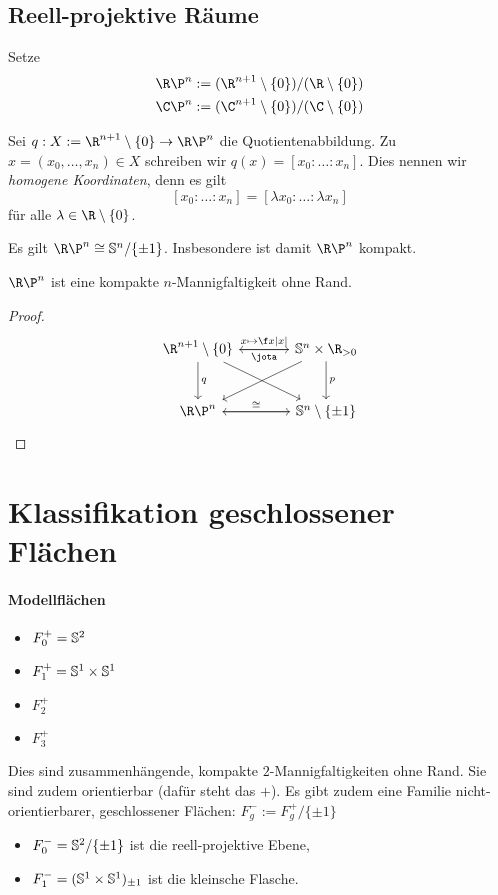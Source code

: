 \subsection{Reell-projektive Räume}

Setze
\begin{align*}
	\R\P^n &:= (\R^{n+1} \setminus \{0\}) / (\R \setminus \{0\}) \\
	\C\P^n &:= (\C^{n+1} \setminus \{0\}) / (\C \setminus \{0\})
\end{align*}

Sei $q: X := \R^{n+1} \setminus \{0\} \to \R\P^n$ die Quotientenabbildung.
Zu $x = (x_0, \dotsc, x_n) \in X$ schreiben wir $q(x) = [x_0 : \dotsc : x_n]$.
Dies nennen wir \emph{homogene Koordinaten}, denn es gilt
\[
	[x_0 : \dotsc : x_n ] = [\lambda x_0 : \dotsc : \lambda x_n]
\]
für alle $\lambda \in \R \setminus \{0\}$.

\begin{nt}
	Es gilt $\R\P^n \homeomorphic \S^n / \{\pm 1\}$.
	Insbesondere ist damit $\R\P^n$ kompakt.

	$\R\P^n$ ist eine kompakte $n$-Mannigfaltigkeit ohne Rand.
	\begin{proof}
		\[
			\begin{tikzcd}[column sep=large,row sep=large]
				\R^{n+1} \setminus \{0\} \arrow{r}{x\mapsto \f x{|x|}} \arrow{d}{q} \arrow{dr}{} &
				\S^n \times \R_{>0} \arrow{l}{\jota} \arrow{dl} \arrow{d}{p} \\
				\R\P^n \arrow{r}{\homeomorphic} &
				\S^n \setminus \{\pm 1\} \arrow{l}
			\end{tikzcd}
		\]
	\end{proof}
\end{nt}


\section{Klassifikation geschlossener Flächen}

\paragraph{Modellflächen}

\begin{ex}
	\begin{itemize}
		\item
			$F_0^+ = \S^2$
		\item
			$F_1^+ = \S^1 \times \S^1$
		\item
			$F_2^+$
		\item
			$F_3^+$
	\end{itemize}
	Dies sind zusammenhängende, kompakte $2$-Mannigfaltigkeiten ohne Rand.
	Sie sind zudem orientierbar (dafür steht das $+$).
	Es gibt zudem eine Familie nicht-orientierbarer, geschlossener Flächen: $F_g^- := F_g^+ / \{\pm 1\}$
	\begin{itemize}
		\item
			$F_0^- = \S^2 / \{\pm 1\}$ ist die reell-projektive Ebene,
		\item
			$F_1^- = (\S^1 \times \S^1)_{\pm 1}$ ist die kleinsche Flasche.
	\end{itemize}
\end{ex}

